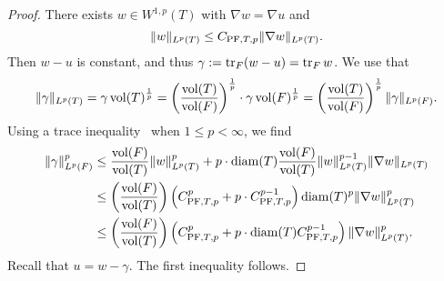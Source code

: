 \documentclass[12pt,a4paper]{article}
\begin{document}
\begin{proof}
    There exists $w \in W^{1,p}(T)$ with $\nabla w = \nabla u$ and 
    \[
        \| w \|_{L^{p}(T)}
        \leq 
        C_{{\rm PF},T,p} 
        \| \nabla w \|_{L^{p}(T)} %
        .
    \]
    Then $w-u$ is constant, and thus $\gamma := \operatorname{tr}_{F} (w-u) = \operatorname{tr}_{F} w$. 
    We use that 
    \[
        \| \gamma \|_{L^{p}(T)}
        =
        \gamma \operatorname{vol}(T)^\frac{1}{p}
        =
        \left( \frac{ \operatorname{vol}(T) }{ \operatorname{vol}(F) } \right)^\frac{1}{p}
        \cdot 
        \gamma 
        \operatorname{vol}(F)^\frac{1}{p}
        =
        \left( \frac{ \operatorname{vol}(T) }{ \operatorname{vol}(F) } \right)^\frac{1}{p}
        \| \gamma \|_{L^{p}(F)}
        .
    \]
    Using a trace inequality~\cite[Lemma~2.8]{veeser2012poincare} when $1 \leq p < \infty$, we find 
    \begin{align*}
        \| \gamma \|_{L^{p}(F)}^{p}
        &
        \leq 
        \frac{ \operatorname{vol}(F) }{ \operatorname{vol}(T) }
        \| w \|_{L^{p}(T)}^{p}
        +
        p
        \cdot 
        {\operatorname{diam}}(T)
        \frac{ \operatorname{vol}(F) }{ \operatorname{vol}(T) }
        \| w \|_{L^{p}(T)}^{p-1}
        \| \nabla w \|_{L^{p}(T)}
        \\&
        \leq 
        \left( \frac{ \operatorname{vol}(F) }{ \operatorname{vol}(T) } \right)
        \left( C_{{\rm PF},T,p}^{p} + p \cdot C_{{\rm PF},T,p}^{p-1} \right) 
        {\operatorname{diam}}(T)^{p}
        \| \nabla w \|_{L^{p}(T)}^{p}
        \\&
        \leq 
        \left( \frac{ \operatorname{vol}(F) }{ \operatorname{vol}(T) } \right)
        \left( C_{{\rm PF},T,p}^{p} + p \cdot {\operatorname{diam}}(T) C_{{\rm PF},T,p}^{p-1} \right) 
        \| \nabla w \|_{L^{p}(T)}^{p}
        .
    \end{align*}
    Recall that $u = w - \gamma$. The first inequality follows. 
    

\end{proof}
\end{document}
